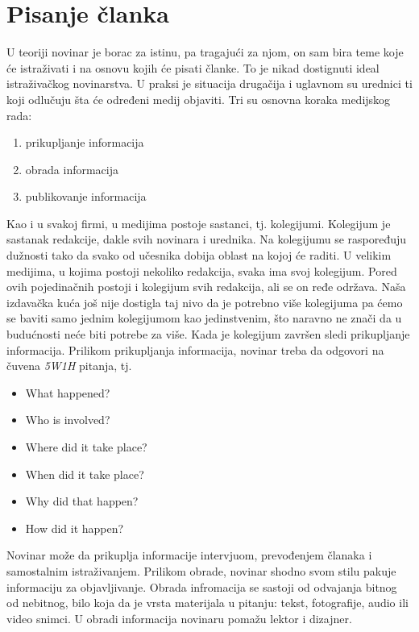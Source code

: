 \section{Pisanje članka}
U teoriji novinar je borac za istinu, pa tragajući za njom, on sam bira teme koje će istraživati i na osnovu kojih će pisati članke. To je nikad dostignuti ideal istraživačkog novinarstva. U praksi je situacija drugačija i uglavnom su urednici ti koji odlučuju šta će određeni medij objaviti.
Tri su osnovna koraka medijskog rada:
\begin{enumerate}
\item prikupljanje informacija
\item obrada informacija
\item publikovanje informacija
\end{enumerate}

Kao i u svakoj firmi, u medijima postoje sastanci, tj. kolegijumi. Kolegijum je sastanak redakcije, dakle svih novinara i urednika. Na kolegijumu se raspoređuju dužnosti tako da svako od učesnika dobija oblast na kojoj će raditi. U velikim medijima, u kojima postoji nekoliko redakcija, svaka ima svoj kolegijum. Pored ovih pojedinačnih postoji i kolegijum svih redakcija, ali se on ređe održava. Naša izdavačka kuća još nije dostigla taj nivo da je potrebno više kolegijuma pa ćemo se baviti samo jednim kolegijumom kao jedinstvenim, što naravno ne znači da u budućnosti neće biti potrebe za više.
Kada je kolegijum završen sledi prikupljanje informacija. Prilikom prikupljanja in\-for\-ma\-ci\-ja, novinar treba da odgovori na čuvena \emph{5W1H} pitanja, tj. \\

\begin{itemize}
\item What happened?
\item Who is involved?
\item Where did it take place?
\item When did it take place?
\item Why did that happen?
\item How did it happen?
\end{itemize}

Novinar može da prikuplja informacije intervjuom, prevođenjem članaka i samostalnim istraživanjem. 
Prilikom obrade, novinar shodno svom stilu pakuje informaciju za objavljivanje. Obrada infromacija se sastoji od odvajanja bitnog od nebitnog, bilo koja da je vrsta materijala u pitanju: tekst, fotografije, audio ili video snimci. U obradi informacija novinaru pomažu lektor i dizajner. 

